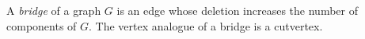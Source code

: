 \documentclass[12pt]{article}
\begin{document}
A \emph{bridge} of a graph $G$ is an edge whose deletion increases the number of components of $G$. The vertex analogue of a bridge is a cutvertex.
\end{document}
